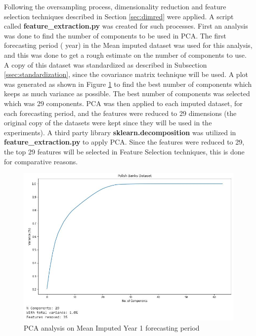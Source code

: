 \noindent Following the oversampling process, dimensionality reduction and feature selection techniques described in Section \ref{sec:dimred} were applied. A script called \textbf{feature\_extraction.py} was created for such processes. First an analysis was done to find the number of components to be used in PCA. The first forecasting period ( year) in the Mean imputed dataset was used for this analysis, and this was done to get a rough estimate on the number of components to use. A copy of this dataset was standardized as described in Subsection \ref{ssec:standardization}, since the covariance matrix technique will be used. A plot was generated as shown in Figure \ref{fig:pca_analysis} to find the best number of components which keeps as much variance as possible. The best number of components was selected which was 29 components. PCA was then applied to each imputed dataset, for each forecasting period, and the features were reduced to 29 dimensions (the original copy of the datasets were kept since they will be used in the experiments). A third party library \textbf{sklearn.decomposition} \cite{python:sklearn_api} was utilized in \textbf{feature\_extraction.py} to apply PCA. Since the features were reduced to 29, the top 29 features will be selected in Feature Selection techniques, this is done for comparative reasons.
\begin{figure}[H]
\centering
  \includegraphics[scale = 0.6]{imgs/pca_analysis.JPG}
  \caption{PCA analysis on Mean Imputed Year 1 forecasting period}
  \label{fig:pca_analysis}
\end{figure}
